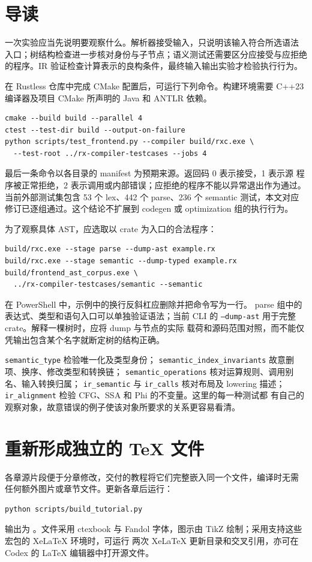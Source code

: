 \section*{导读}
一次实验应当先说明要观察什么。解析器接受输入，只说明该输入符合所选语法
入口；树结构检查进一步核对身份与子节点；语义测试还需要区分应接受与应拒绝
的程序。IR 验证检查计算表示的良构条件，最终输入输出实验才检验执行行为。

在 Rustless 仓库中完成 CMake 配置后，可运行下列命令。构建环境需要 C++23
编译器及项目 CMake 所声明的 Java 和 ANTLR 依赖。
\begin{lstlisting}
cmake --build build --parallel 4
ctest --test-dir build --output-on-failure
python scripts/test_frontend.py --compiler build/rxc.exe \
  --test-root ../rx-compiler-testcases --jobs 4
\end{lstlisting}
最后一条命令以各目录的 manifest 为预期来源。返回码 0 表示接受，1 表示源
程序被正常拒绝，2 表示调用或内部错误；应拒绝的程序不能以异常退出作为通过。
当前外部测试集包含 53 个 lex、442 个 parse、236 个 semantic 测试，本文对应
修订已逐组通过。这个结论不扩展到 codegen 或 optimization 组的执行行为。

为了观察具体 AST，应选取以 crate 为入口的合法程序：
\begin{lstlisting}
build/rxc.exe --stage parse --dump-ast example.rx
build/rxc.exe --stage semantic --dump-typed example.rx
build/frontend_ast_corpus.exe \
  ../rx-compiler-testcases/semantic --semantic
\end{lstlisting}
在 PowerShell 中，示例中的换行反斜杠应删除并把命令写为一行。
parse 组中的表达式、类型和语句入口可以单独验证语法；当前 CLI 的
\texttt{--dump-ast} 用于完整 crate。解释一棵树时，应将 dump 与节点的实际
载荷和源码范围对照，而不能仅凭输出包含某个名字就断定树的结构正确。

\texttt{semantic\_type} 检验唯一化及类型身份；
\texttt{semantic\_index\_invariants} 故意删项、换序、修改类型和转换链；
\texttt{semantic\_operations} 核对运算规则、调用别名、输入转换归属；
\texttt{ir\_semantic} 与 \texttt{ir\_calls} 核对布局及 lowering 描述；
\texttt{ir\_alignment} 检验 CFG、SSA 和 Phi 的不变量。这里的每一种测试都
有自己的观察对象，故意错误的例子使该对象所要求的关系更容易看清。

\section{重新形成独立的 TeX 文件}
各章源片段便于分章修改，交付的教程将它们完整嵌入同一个文件，编译时无需
任何额外图片或章节文件。更新各章后运行：
\begin{lstlisting}
python scripts/build_tutorial.py
\end{lstlisting}
输出为 。文件采用 ctexbook 与
Fandol 字体，图示由 TikZ 绘制；采用支持这些宏包的 XeLaTeX 环境时，可运行
两次 XeLaTeX 更新目录和交叉引用，亦可在 Codex 的 LaTeX 编辑器中打开源文件。

